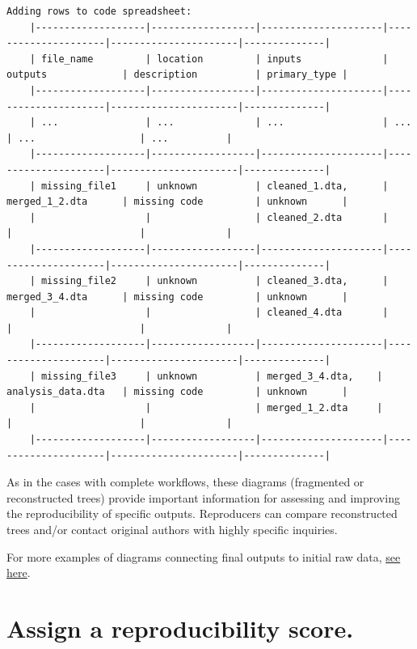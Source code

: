 \documentclass[]{book}
\begin{document}
\begin{verbatim}
Adding rows to code spreadsheet:
    |-------------------|------------------|---------------------|---------------------|----------------------|--------------|
    | file_name         | location         | inputs              | outputs             | description          | primary_type |
    |-------------------|------------------|---------------------|---------------------|----------------------|--------------|
    | ...               | ...              | ...                 | ...                 | ...                  | ...          |
    |-------------------|------------------|---------------------|---------------------|----------------------|--------------|
    | missing_file1     | unknown          | cleaned_1.dta,      | merged_1_2.dta      | missing code         | unknown      |
    |                   |                  | cleaned_2.dta       |                     |                      |              |
    |-------------------|------------------|---------------------|---------------------|----------------------|--------------|
    | missing_file2     | unknown          | cleaned_3.dta,      | merged_3_4.dta      | missing code         | unknown      |
    |                   |                  | cleaned_4.dta       |                     |                      |              |                  
    |-------------------|------------------|---------------------|---------------------|----------------------|--------------|
    | missing_file3     | unknown          | merged_3_4.dta,    | analysis_data.dta   | missing code         | unknown      |
    |                   |                  | merged_1_2.dta     |                     |                      |              |                  
    |-------------------|------------------|---------------------|---------------------|----------------------|--------------|
\end{verbatim}

As in the cases with complete workflows, these diagrams (fragmented or reconstructed trees) provide important information for assessing and improving the reproducibility of specific outputs. Reproducers can compare reconstructed trees and/or contact original authors with highly specific inquiries.

For more examples of diagrams connecting final outputs to initial raw data, \protect\hyperlink{additional-diagrams}{see here}.

\hypertarget{score}{%
\section{Assign a reproducibility score.}\label{score}}
\end{document}
